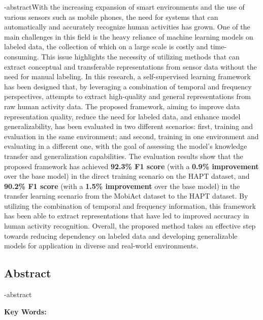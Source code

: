 
\en-abstract{With the increasing expansion of smart environments and the use of various sensors such as mobile phones, the need for systems that can automatically and accurately recognize human activities has grown. One of the main challenges in this field is the heavy reliance of machine learning models on labeled data, the collection of which on a large scale is costly and time-consuming. This issue highlights the necessity of utilizing methods that can extract conceptual and transferable representations from sensor data without the need for manual labeling. In this research, a self-supervised learning framework has been designed that, by leveraging a combination of temporal and frequency perspectives, attempts to extract high-quality and general representations from raw human activity data. The proposed framework, aiming to improve data representation quality, reduce the need for labeled data, and enhance model generalizability, has been evaluated in two different scenarios: first, training and evaluation in the same environment; and second, training in one environment and evaluating in a different one, with the goal of assessing the model's knowledge transfer and generalization capabilities. The evaluation results show that the proposed framework has achieved \textbf{92.3\% F1 score} (with a \textbf{0.9\% improvement} over the base model) in the direct training scenario on the HAPT dataset, and \textbf{90.2\% F1 score} (with a \textbf{1.5\% improvement} over the base model) in the transfer learning scenario from the MobiAct dataset to the HAPT dataset. By utilizing the combination of temporal and frequency information, this framework has been able to extract representations that have led to improved accuracy in human activity recognition. Overall, the proposed method takes an effective step towards reducing dependency on labeled data and developing generalizable models for application in diverse and real-world environments.}

\newpage
\thispagestyle{empty}
\begin{latin}
\section*{\LARGE\centering Abstract}

\een-abstract

\vspace*{.5cm}
{\noindent\large\textbf{Key Words:}}\par
\vspace*{.5cm}
\noindent\elatinkeywords
\end{latin}